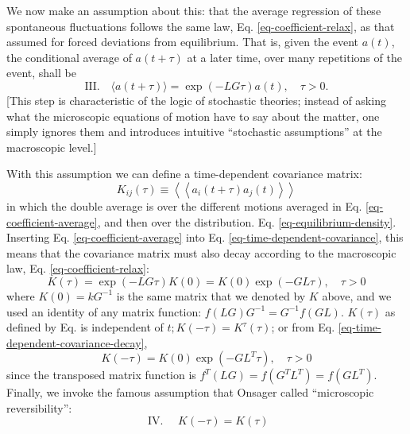 \documentclass{article}
\begin{document}
We now make an assumption about this: that the average regression of these spontaneous fluctuations follows the same law, Eq. \ref{eq-coefficient-relax}, as that assumed for forced deviations from equilibrium. That is, given the event $a(t)$, the conditional average of $a(t+\tau)$ at a later time, over many repetitions of the event, shall be
\begin{equation}
\text{III.} \quad \langle a(t+\tau)\rangle=\exp (-L G \tau) a(t), \quad \tau>0. \label{eq-coefficient-average}
\end{equation}
[This step is characteristic of the logic of stochastic theories; instead of asking what the microscopic equations of motion have to say about the matter, one simply ignores them and introduces intuitive ``stochastic assumptions'' at the macroscopic level.]

With this assumption we can define a time-dependent covariance matrix:
\begin{equation}
K_{i j}(\tau) \equiv\left\langle\left\langle a_i(t+\tau) a_j(t)\right\rangle\right\rangle \label{eq-time-dependent-covariance}
\end{equation}
in which the double average is over the different motions averaged in Eq. \ref{eq-coefficient-average}, and then over the distribution. Eq. \ref{eq-equilibrium-density}. Inserting Eq. \ref{eq-coefficient-average} into Eq. \ref{eq-time-dependent-covariance}, this means that the covariance matrix must also decay according to the macroscopic law, Eq. \ref{eq-coefficient-relax}:
\begin{equation}
K(\tau)=\exp (-L G \tau) K(0)=K(0) \exp (-G L \tau), \quad \tau>0 \label{eq-time-dependent-covariance-decay}
\end{equation}
where $K(0)=k G^{-1}$ is the same matrix that we denoted by $K$ above, and we used an identity of any matrix function: $f(L G) G^{-1}=G^{-1} f(G L)$. $K(\tau)$ as defined by Eq. \label{eq-coefficient-average} is independent of $t ; K(-\tau)=K^\tau(\tau)$; or from Eq. \ref{eq-time-dependent-covariance-decay},
\begin{equation}
K(-\tau)=K(0) \exp \left(-G L^T \tau\right), \quad \tau>0 \label{eq-time-dependent-covariance-decay-negative}
\end{equation}
since the transposed matrix function is $f^T(L G)=f\left(G^T L^T\right)=f\left(G L^T\right)$.
Finally, we invoke the famous assumption that Onsager called ``microscopic reversibility'':
\begin{equation}
\text { IV. } \quad K(-\tau)=K(\tau) \label{eq-onsager-microsopic-reversibility}
\end{equation}
\end{document}

